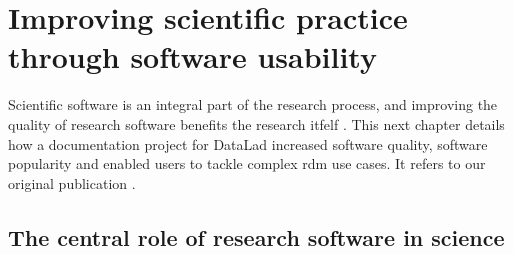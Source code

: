 
\renewcommand*\dictumwidth{0.5\linewidth}

\chapter{Improving scientific practice through software usability}
\label{chap:k2}



Scientific software is an integral part of the research process, and improving the quality of research software benefits the research itfelf \citep{goble2014better}.
This next chapter details how a documentation project for DataLad increased software quality, software popularity and enabled users to tackle complex \gls{rdm} use cases.
It refers to our original publication \citep{wagner2020datalad}.


\section{The central role of research software in science}


